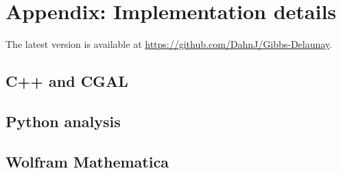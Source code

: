 \chapter{Appendix: Implementation details}\label{appendix:implementation}
The latest version is available at \url{https://github.com/DahnJ/Gibbs-Delaunay}.
\section{C++ and CGAL}
\tbd
\section{Python analysis}
\tbd
\section{Wolfram Mathematica}
\tbd

